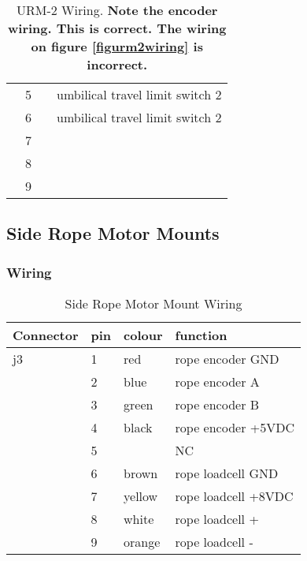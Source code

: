 \begin{table}
\begin{center}
\begin{tabular}{|l|l|l|l|}
   & 5 &        & umbilical travel limit switch 2\\
   & 6 &        & umbilical travel limit switch 2\\
   & 7 &        &        \\
   & 8 &        &        \\
   & 9 &        &        \\
\hline
\end{tabular}
\end{center}
\caption[URM-2 Wiring]
  {URM-2 Wiring.   {\bf Note the encoder wiring.  This is correct.
    The wiring on figure \ref{figurm2wiring} is incorrect.}
   }
\end{table}
  

\newpage
\subsection{Side Rope Motor Mounts}
 
\subsubsection{Wiring}

\begin{table}
\begin{center}
\begin{tabular}{|l|l|l|l|} 
\hline
Connector & pin & colour& function \\
\hline
j3 & 1 & red   & rope encoder GND \\
   & 2 & blue  & rope encoder A \\
   & 3 & green & rope encoder B \\
   & 4 & black & rope encoder +5VDC \\
   & 5 &       & NC \\
   & 6 & brown  & rope loadcell GND \\
   & 7 & yellow & rope loadcell +8VDC \\
   & 8 & white  & rope loadcell + \\
   & 9 & orange & rope loadcell - \\
\hline
\end{tabular}
\end{center}
\caption[Side Rope Motor Mount Wiring]
  {Side Rope Motor Mount Wiring
   }
\end{table}
  

  
